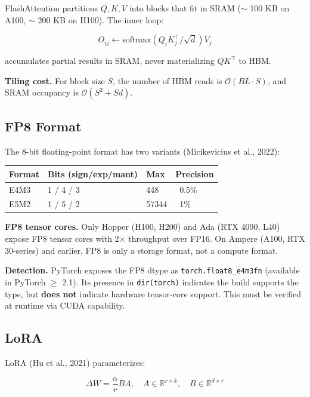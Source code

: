 FlashAttention partitions $Q, K, V$ into blocks that fit in SRAM ($\sim$ 100 KB 
on A100, $\sim$ 200 KB on H100). The inner loop:

\[
O_{ij} \leftarrow \text{softmax}(Q_i K_j^\top / \sqrt{d}) V_j
\tag{3.3}
\]

accumulates partial results in SRAM, never materializing $QK^\top$ to HBM.

\textbf{Tiling cost.} For block size $S$, the number of HBM reads is 
$\mathcal{O}(BL \cdot S)$, and SRAM occupancy is $\mathcal{O}(S^2 + Sd)$.

\subsection{FP8 Format}

The 8-bit floating-point format has two variants (Micikevicius et al., 2022):

\begin{table}[H]
\centering
\small
\begin{tabular}{llll}
\toprule
\textbf{Format} & \textbf{Bits (sign/exp/mant)} & \textbf{Max} & \textbf{Precision} \\
\midrule
E4M3 & 1 / 4 / 3 & 448 & ~0.5\% \\
E5M2 & 1 / 5 / 2 & 57344 & ~1\% \\
\bottomrule
\end{tabular}
\end{table}

\textbf{FP8 tensor cores.} Only Hopper (H100, H200) and Ada (RTX 4090, L40) expose 
FP8 tensor cores with 2$\times$ throughput over FP16. On Ampere (A100, RTX 30-series) 
and earlier, FP8 is only a storage format, not a compute format.

\textbf{Detection.} PyTorch exposes the FP8 dtype as \texttt{torch.float8\_e4m3fn} 
(available in PyTorch $\ge$ 2.1). Its presence in \texttt{dir(torch)} indicates the 
build supports the type, but \textbf{does not} indicate hardware tensor-core 
support. This must be verified at runtime via CUDA capability.

\subsection{LoRA}

LoRA (Hu et al., 2021) parameterizes:

\[
\Delta W = \frac{\alpha}{r} BA, \quad
A \in \mathbb{R}^{r \times k}, \quad
B \in \mathbb{R}^{d \times r}
\tag{3.4}
\]

